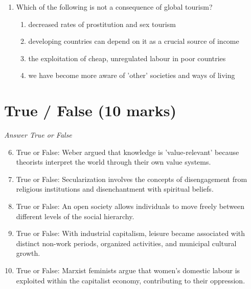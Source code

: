 \documentclass[12pt]{article}
\begin{document}
\begin{enumerate}[label=\arabic*.]
\begin{enumerate}[label=(\alph*)]
    \item Functionalism
    \item Conflict theory
    \item Symbolic interactionism
    \item Role theory
\end{enumerate}
\item Which of the following is not a consequence of global tourism?
\begin{enumerate}[label=(\alph*)]
    \item decreased rates of prostitution and sex tourism
    \item developing countries can depend on it as a crucial source of income
    \item the exploitation of cheap, unregulated labour in poor countries
    \item we have become more aware of 'other' societies and ways of living
\end{enumerate}
\end{enumerate}

\section*{True / False (10 marks)}
\textit{Answer True or False}
\begin{enumerate}[label=\arabic*.]
\setcounter{enumi}{5}
\item True or False: Weber argued that knowledge is 'value-relevant' because theorists interpret the world through their own value systems.
\item True or False: Secularization involves the concepts of disengagement from religious institutions and disenchantment with spiritual beliefs.
\item True or False: An open society allows individuals to move freely between different levels of the social hierarchy.
\item True or False: With industrial capitalism, leisure became associated with distinct non-work periods, organized activities, and municipal cultural growth.
\item True or False: Marxist feminists argue that women's domestic labour is exploited within the capitalist economy, contributing to their oppression.
\end{enumerate}
\end{document}
